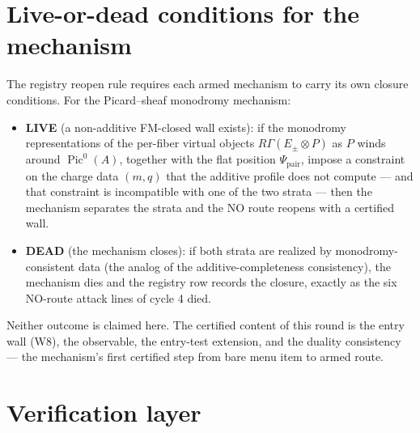 \documentclass[11pt]{article}
\newcommand{\Pic}{\operatorname{Pic}}
\newcommand{\KA}{A}
\begin{document}
\section{Live-or-dead conditions for the mechanism}
\label{sec:live-or-dead}

The registry reopen rule requires each armed mechanism to carry its own
closure conditions. For the Picard--sheaf monodromy mechanism:

\begin{itemize}
\item \textbf{LIVE} (a non-additive FM-closed wall exists): if the monodromy
representations of the per-fiber virtual objects
$R\Gamma(E_\pm\otimes P)$ as $P$ winds around $\Pic^0(\KA)$, together with
the flat position $\Psi_{\mathrm{pair}}$, impose a constraint on the charge
data $(m,q)$ that the additive profile does not compute --- and that
constraint is incompatible with one of the two strata --- then the mechanism
separates the strata and the NO route reopens with a certified wall.
\item \textbf{DEAD} (the mechanism closes): if both strata are realized by
monodromy-consistent data (the analog of the additive-completeness
consistency), the mechanism dies and the registry row records the closure,
exactly as the six NO-route attack lines of cycle 4 died.
\end{itemize}

Neither outcome is claimed here. The certified content of this round is the
entry wall (W8), the observable, the entry-test extension, and the
duality consistency --- the mechanism's first certified step from bare menu
item to armed route.

\section{Verification layer}
\end{document}
